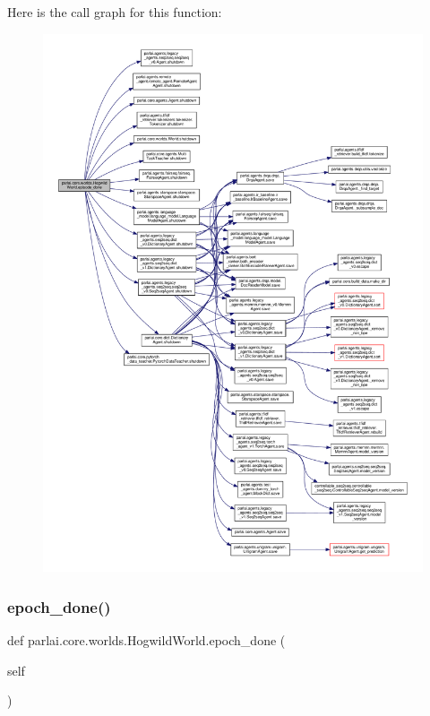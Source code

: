 Here is the call graph for this function\+:
\nopagebreak
\begin{figure}[H]
\begin{center}
\leavevmode
\includegraphics[width=350pt]{classparlai_1_1core_1_1worlds_1_1HogwildWorld_a0425099fbc33cb97d6fbe67dbd2e8a1f_cgraph}
\end{center}
\end{figure}
\mbox{\label{classparlai_1_1core_1_1worlds_1_1HogwildWorld_ae80d3f592818ac39b9cf8802270d8d8a}} 
\subsubsection{\texorpdfstring{epoch\+\_\+done()}{epoch\_done()}}
{\footnotesize\ttfamily def parlai.\+core.\+worlds.\+Hogwild\+World.\+epoch\+\_\+done (\begin{DoxyParamCaption}\item[{}]{self }\end{DoxyParamCaption})}

